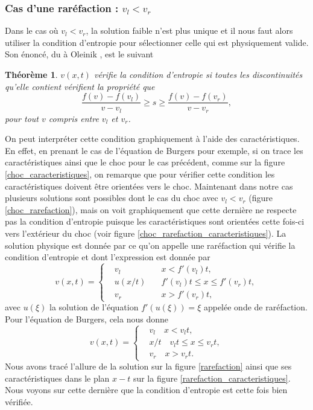 \documentclass[11pt,a4paper]{article}
\newtheorem{theorem}{Théorème}[section]
\begin{document}
\subsubsection{Cas d'une raréfaction : $v_l < v_r$}

Dans le cas où $v_l < v_r$, la solution faible n'est plus unique et il nous faut alors utiliser la condition d'entropie pour sélectionner celle qui est physiquement valide. Son énoncé, du à Oleinik \cite{oleinik1957discontinuous}, est le suivant 
\begin{theorem}
		$v(x,t)$ vérifie la condition d'entropie si toutes les discontinuités qu'elle contient vérifient la propriété que 
		\begin{equation}
			\frac{f(v) - f(v_l)}{v -v_l} \geq s \geq \frac{f(v) - f(v_r)}{v - v_r},
		\end{equation}
		pour tout $v$ compris entre $v_l$ et $v_r$.
\end{theorem}
On peut interpréter cette condition graphiquement à l'aide des caractéristiques. En effet, en prenant le cas de l'équation de Burgers pour exemple, si on trace les caractéristiques ainsi que le choc pour le cas précédent, comme sur la figure \ref{choc_caracteristiques}, on remarque que pour vérifier cette condition  les caractéristiques doivent être orientées vers le choc. 
Maintenant dans notre cas plusieurs solutions sont possibles dont le cas du choc avec $v_l<v_r$ (figure \ref{choc_rarefaction}), mais on voit graphiquement que cette dernière ne respecte pas la condition d'entropie puisque les caractéristiques sont orientées cette fois-ci vers l'extérieur du choc (voir figure \ref{choc_rarefaction_caracteristiques}). La solution physique est donnée par ce qu'on appelle une raréfaction qui vérifie la condition d'entropie et dont l'expression est donnée par
\begin{equation}
	v(x,t) =
	\left\{
		\begin{aligned}
			& v_l \quad & x<f'(v_l)t,\\
			& u(x/t)\quad & f'(v_l)t\leq x\leq f'(v_r)t,\\
			& v_r\quad & x> f'(v_r)t,
		\end{aligned}
	\right.
\end{equation}
avec $u(\xi)$ la solution de l'équation $f'(u(\xi)) = \xi$ appelée onde de raréfaction. Pour l'équation de Burgers, cela nous donne
\begin{equation}
	v(x,t) =
	\left\{
		\begin{aligned}
			& v_l \quad x<v_lt,\\
			& x/t\quad v_l t\leq x\leq v_r t,\\
			& v_r\quad x> v_r t.
		\end{aligned}
	\right.
\end{equation}
Nous avons tracé l'allure de la solution sur la figure \ref{rarefaction} ainsi que ses caractéristiques dans le plan $x-t$ sur la figure \ref{rarefaction_caracteristiques}. Nous voyons sur cette dernière que la condition d'entropie est cette fois bien vérifiée.
\end{document}
